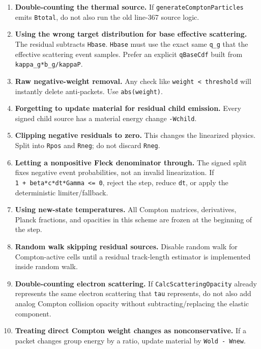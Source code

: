\documentclass[
]{article}
\begin{document}
\begin{enumerate}
\def\labelenumi{\arabic{enumi}.}
\item
  \textbf{Double-counting the thermal source.} If
  \texttt{generateComptonParticles} emits \texttt{Btotal}, do not also
  run the old line-367 source logic.
\item
  \textbf{Using the wrong target distribution for base effective
  scattering.} The residual subtracts \texttt{Hbase}. \texttt{Hbase}
  must use the exact same \texttt{q\_g} that the effective scattering
  event samples. Prefer an explicit \texttt{qBaseCdf} built from
  \texttt{kappa\_g*b\_g/kappaP}.
\item
  \textbf{Raw negative-weight removal.} Any check like
  \texttt{weight\ \textless{}\ threshold} will instantly delete
  anti-packets. Use \texttt{abs(weight)}.
\item
  \textbf{Forgetting to update material for residual child emission.}
  Every signed child source has a material energy change
  \texttt{-Wchild}.
\item
  \textbf{Clipping negative residuals to zero.} This changes the
  linearized physics. Split into \texttt{Rpos} and \texttt{Rneg}; do not
  discard \texttt{Rneg}.
\item
  \textbf{Letting a nonpositive Fleck denominator through.} The signed
  split fixes negative event probabilities, not an invalid
  linearization. If \texttt{1\ +\ beta*c*dt*Gamma\ \textless{}=\ 0},
  reject the step, reduce \texttt{dt}, or apply the deterministic
  limiter/fallback.
\item
  \textbf{Using new-state temperatures.} All Compton matrices,
  derivatives, Planck fractions, and opacities in this scheme are frozen
  at the beginning of the step.
\item
  \textbf{Random walk skipping residual sources.} Disable random walk
  for Compton-active cells until a residual track-length estimator is
  implemented inside random walk.
\item
  \textbf{Double-counting electron scattering.} If
  \texttt{CalcScatteringOpacity} already represents the same electron
  scattering that \texttt{tau} represents, do not also add analog
  Compton collision opacity without subtracting/replacing the elastic
  component.
\item
  \textbf{Treating direct Compton weight changes as nonconservative.} If
  a packet changes group energy by a ratio, update material by
  \texttt{Wold\ -\ Wnew}.
\end{enumerate}
\end{document}
